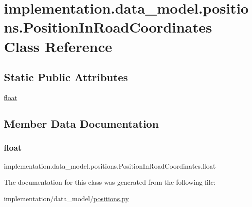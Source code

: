 \hypertarget{classimplementation_1_1data__model_1_1positions_1_1_position_in_road_coordinates}{}\section{implementation.\+data\+\_\+model.\+positions.\+Position\+In\+Road\+Coordinates Class Reference}
\label{classimplementation_1_1data__model_1_1positions_1_1_position_in_road_coordinates}
\subsection*{Static Public Attributes}
\begin{DoxyCompactItemize}
\item 
\hyperlink{classimplementation_1_1data__model_1_1positions_1_1_position_in_road_coordinates_a2dde876c5460a82024fc340fd5000154}{float}
\end{DoxyCompactItemize}


\subsection{Member Data Documentation}
\mbox{\label{classimplementation_1_1data__model_1_1positions_1_1_position_in_road_coordinates_a2dde876c5460a82024fc340fd5000154}} 
\subsubsection{\texorpdfstring{float}{float}}
{\footnotesize\ttfamily implementation.\+data\+\_\+model.\+positions.\+Position\+In\+Road\+Coordinates.\+float\hspace{0.3cm}{\ttfamily [static]}}



The documentation for this class was generated from the following file\+:\begin{DoxyCompactItemize}
\item 
implementation/data\+\_\+model/\hyperlink{positions_8py}{positions.\+py}\end{DoxyCompactItemize}

